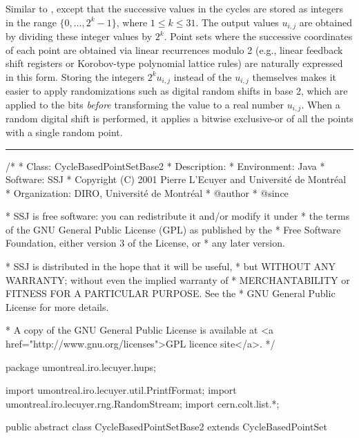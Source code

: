 
Similar to , except that the successive
values in the cycles are stored as integers in the range
$\{0,\dots,2^k-1\}$, where $1\le k \le 31$.
The output values $u_{i,j}$ are obtained by dividing these integer
values by $2^k$.  Point sets where the successive coordinates of each
point are obtained via linear recurrences modulo 2 (e.g., linear feedback
shift registers or Korobov-type polynomial lattice rules)
are naturally expressed in this form.
Storing the integers $2^k u_{i,j}$ instead of the $u_{i,j}$ themselves
makes it easier to apply randomizations such as digital random shifts
in base 2, which are applied to the bits \emph{before} transforming
the value to a real number $u_{i,j}$. When a random digital shift is
performed, it applies a bitwise exclusive-or of all the points with a single
  random point.

\bigskip\hrule\bigskip

\begin{code}
\begin{hide}
/*
 * Class:        CycleBasedPointSetBase2
 * Description:  
 * Environment:  Java
 * Software:     SSJ 
 * Copyright (C) 2001  Pierre L'Ecuyer and Université de Montréal
 * Organization: DIRO, Université de Montréal
 * @author       
 * @since

 * SSJ is free software: you can redistribute it and/or modify it under
 * the terms of the GNU General Public License (GPL) as published by the
 * Free Software Foundation, either version 3 of the License, or
 * any later version.

 * SSJ is distributed in the hope that it will be useful,
 * but WITHOUT ANY WARRANTY; without even the implied warranty of
 * MERCHANTABILITY or FITNESS FOR A PARTICULAR PURPOSE.  See the
 * GNU General Public License for more details.

 * A copy of the GNU General Public License is available at
   <a href="http://www.gnu.org/licenses">GPL licence site</a>.
 */
\end{hide}
package umontreal.iro.lecuyer.hups;\begin{hide}

import umontreal.iro.lecuyer.util.PrintfFormat;
import umontreal.iro.lecuyer.rng.RandomStream;
import cern.colt.list.*;
\end{hide}

public abstract class CycleBasedPointSetBase2 extends CycleBasedPointSet\begin{hide} {

// dim = Integer.MAX_VALUE;     // Dimension is infinite.
   private int[] digitalShift;  // Digital shift, initially zero (null).
                                // Entry j is for dimension j.
   protected int numBits;       // Number of bits in stored values.
   protected double normFactor; // To convert output to (0,1); 1/2^numBits.

\end{hide}
\end{code}

